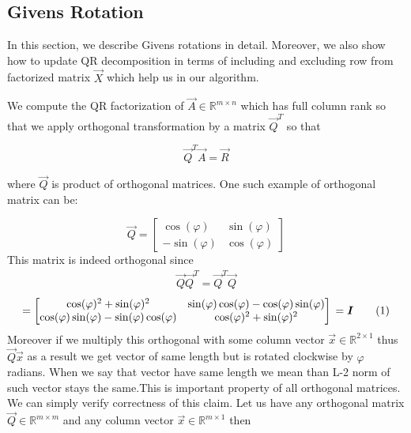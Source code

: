 

\subsection*{Givens Rotation} \label{givensrotation}
In this section, we describe Givens rotations in detail. Moreover, we also show how to update QR decomposition in terms of including and excluding row from factorized matrix $\vec{X}$ which help us in our algorithm.

We compute the QR factorization of $\vec{A} \in \mathbb{R}^{m \times n}$ which has full column rank so that we apply orthogonal transformation by a matrix $\vec{Q}^T$ so that \cite{hammarling2008updatingqr}

\begin{equation}
    \vec{Q}^T\vec{A} = \vec{R}
\end{equation}
 
where $\vec{Q}$ is product of orthogonal matrices. One such example of orthogonal matrix can be:

\begin{equation} \label{givensmatrix}
\vec{Q} = 
\begin{bmatrix} 
\cos(\varphi) & \sin(\varphi) \\
- \sin(\varphi) & \cos(\varphi)
\end{bmatrix}
\end{equation}
This matrix is indeed orthogonal since 
\begin{align*} 
\vec{Q}\vec{Q}^T = \vec{Q}^T\vec{Q}    
\end{align*}
 \begin{equation*}
    = \begin{bmatrix} 
        \cos(\varphi)^2 + \sin(\varphi)^2  & \sin(\varphi)\cos(\varphi) - \cos(\varphi)\sin(\varphi) \\
        \cos(\varphi)\sin(\varphi) - \sin(\varphi)\cos(\varphi) & \cos(\varphi)^2 + \sin(\varphi)^2
    \end{bmatrix} \\ = \vec{I}
    \numberthis
\end{equation*}
Moreover if we multiply this orthogonal with some column vector $\vec{x} \in \mathbb{R}^{2 \times 1}$ thus $\vec{Q}\vec{x}$ as a result we get vector of same length but is rotated clockwise by  $\varphi$ radians. When we say that vector have same length we mean than L-2 norm of such vector stays the same.This is important property of all orthogonal matrices. We can simply verify correctness of this claim. Let us have any orthogonal matrix $\vec{Q} \in \mathbb{R}^{m \times m}$ and any column vector $\vec{x} \in  \mathbb{R}^{m \times 1}$ then

